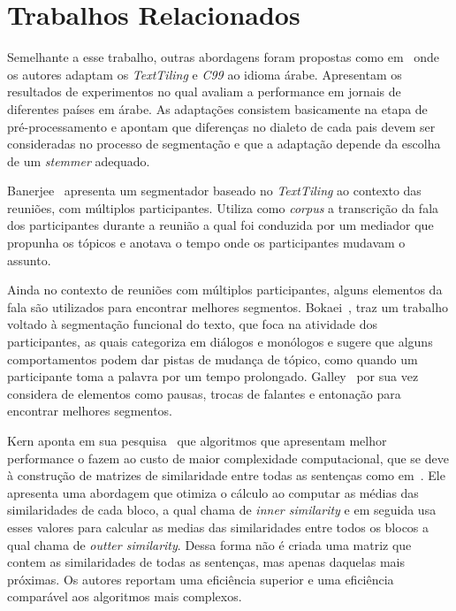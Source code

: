 \section{Trabalhos Relacionados}
	\label{sec:trabalhos}


Semelhante a esse trabalho, outras abordagens foram propostas como em~\cite{CHAIBI2014} onde os autores adaptam os \textit{TextTiling} e \textit{C99} ao idioma árabe. Apresentam os resultados de experimentos no qual avaliam a performance em jornais de diferentes países em árabe. As adaptações consistem basicamente na etapa de pré-processamento e apontam que diferenças no dialeto de cada pais devem ser consideradas no processo de segmentação e que a adaptação depende da escolha de um \textit{stemmer} adequado.


Banerjee~\cite{Banerjee2006} apresenta um segmentador baseado no  \textit{TextTiling} ao contexto das reuniões, com múltiplos participantes. Utiliza como \textit{corpus} a transcrição da fala dos participantes durante a reunião a qual foi conduzida por um mediador que propunha os tópicos e anotava o tempo onde os participantes mudavam o assunto. 

Ainda no contexto de reuniões com múltiplos participantes, alguns elementos da fala são utilizados para encontrar melhores segmentos.
%
Bokaei~\cite{Bokaei2015}, traz um trabalho voltado à segmentação funcional do texto, que foca na atividade dos participantes, as quais categoriza em diálogos e monólogos e sugere que alguns comportamentos podem dar pistas de mudança de tópico, como quando um participante toma a palavra por um tempo prolongado. 
Galley~\cite{Galley2003} por sua vez considera de elementos como pausas, trocas de falantes e entonação para encontrar melhores segmentos.

Kern aponta em sua pesquisa~\cite{Kern2009} que algoritmos que apresentam melhor performance o fazem ao custo de maior complexidade computacional, que se deve à construção de matrizes de similaridade entre todas as sentenças como em~\cite{Choi2000}. Ele apresenta uma abordagem que otimiza o cálculo ao computar as médias das similaridades de cada bloco, a qual chama de \textit{inner similarity} e em seguida usa esses valores para calcular as medias das similaridades entre todos os blocos a qual chama de \textit{outter similarity}. Dessa forma não é criada uma matriz que contem as similaridades de todas as sentenças, mas apenas daquelas mais próximas. Os autores reportam uma eficiência superior e uma eficiência comparável aos algoritmos mais complexos.


